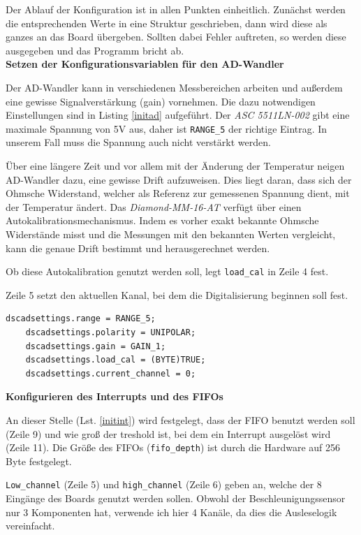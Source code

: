 \documentclass[12pt,a4paper]{scrartcl}
\begin{document}
Der Ablauf der Konfiguration ist in allen Punkten einheitlich. Zunächst werden die entsprechenden Werte in eine Struktur geschrieben, dann wird diese als ganzes an das Board übergeben. Sollten dabei Fehler auftreten, so werden diese ausgegeben und das Programm bricht ab. \\

\textbf{Setzen der Konfigurationsvariablen für den AD-Wandler}

Der AD-Wandler kann in verschiedenen Messbereichen arbeiten und außerdem eine gewisse Signalverstärkung (gain) vornehmen. Die dazu notwendigen Einstellungen sind in Listing \ref{initad} aufgeführt. 
Der \textit{ASC 5511LN-002} gibt eine maximale Spannung von 5V aus, daher ist \texttt{RANGE\_5} der richtige Eintrag. In unserem Fall muss die Spannung auch nicht verstärkt werden. 

Über eine längere Zeit und vor allem mit der Änderung der Temperatur neigen AD-Wandler dazu, eine gewisse Drift aufzuweisen. Dies liegt daran, dass sich der Ohmsche Widerstand, welcher als Referenz zur gemessenen Spannung dient, mit der Temperatur ändert. Das \textit{Diamond-MM-16-AT} verfügt über einen Autokalibrationsmechanismus. Indem es vorher exakt bekannte Ohmsche Widerstände misst und die Messungen mit den bekannten Werten vergleicht, kann die genaue Drift bestimmt und herausgerechnet werden\citep[siehe auch][]{Miller:2006fk}.

Ob diese Autokalibration genutzt werden soll, legt \texttt{load\_cal} in Zeile 4 fest.

Zeile 5 setzt den aktuellen Kanal, bei dem die Digitalisierung beginnen soll fest.

\begin{lstlisting}[frame=trBL]
	dscadsettings.range = RANGE_5;
	dscadsettings.polarity = UNIPOLAR;
	dscadsettings.gain = GAIN_1;
	dscadsettings.load_cal = (BYTE)TRUE;
	dscadsettings.current_channel = 0;
\end{lstlisting}


\textbf{Konfigurieren des Interrupts und des FIFOs}

An dieser Stelle (Lst. \ref{initint}) wird festgelegt, dass der FIFO benutzt werden soll (Zeile 9) und wie groß der treshold ist, bei dem ein Interrupt ausgelöst wird (Zeile 11). Die Größe des FIFOs (\texttt{fifo\_depth}) ist durch die Hardware auf 256 Byte festgelegt.

\texttt{Low\_channel} (Zeile 5) und \texttt{high\_channel} (Zeile 6) geben an, welche der 8 Eingänge des Boards genutzt werden sollen. Obwohl der Beschleunigungssensor nur 3 Komponenten hat, verwende ich hier 4 Kanäle, da dies die Ausleselogik vereinfacht.
\end{document}
